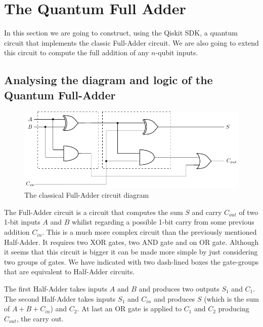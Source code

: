 \newpage
\section{The Quantum Full Adder}

In this section we are going to construct, using the Qiskit SDK, a quantum circuit that implements the classic Full-Adder circuit.
We are also going to extend this circuit to compute the full addition of any $n$-qubit inputs.

\subsection{Analysing the diagram and logic of the Quantum Full-Adder}

\begin{figure}[ht]
    \centering
    \includegraphics{images/5_Implementation/classical_fulladder_diagram.pdf}
    \caption{The classical Full-Adder circuit diagram}
\end{figure}

The Full-Adder circuit is a circuit that computes the sum $S$ and carry $C_{out}$ of two 1-bit inputs $A$ and $B$ whilist regarding a possible 1-bit
carry from some previous addition $C_{in}$. This is a much more complex circuit than the previously mentioned Half-Adder. It requires two XOR gates,
two AND gate and on OR gate. Although it seems that this circuit is bigger it can be made more simple by just considering two groups of gates. We
have indicated with two dash-lined boxes the gate-groups that are equivalent to Half-Adder circuits.

The first Half-Adder takes inputs $A$ and $B$ and produces two outputs $S_1$ and $C_1$. The second Half-Adder takes inputs $S_1$ and $C_{in}$ and produces
$S$ (which is the sum of $A + B + C_{in}$) and $C_2$. At last an OR gate is applied to $C_1$ and $C_2$ producing $C_{out}$, the carry out.

